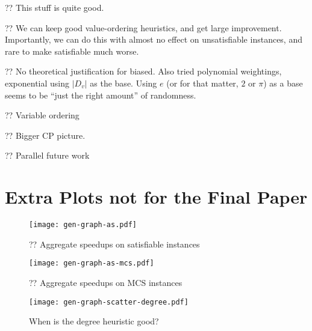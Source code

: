 \documentclass{article}
\begin{document}
?? This stuff is quite good.

?? We can keep good value-ordering heuristics, and get large improvement. Importantly, we can do
this with almost no effect on unsatisfiable instances, and rare to make satisfiable much worse.

?? No theoretical justification for biased. Also tried polynomial weightings, exponential using
$\left|D_v\right|$ as the base. Using $e$ (or for that matter, $2$ or $\pi$) as a base seems to be
``just the right amount'' of randomness.

?? Variable ordering

?? Bigger CP picture.

?? Parallel future work

\clearpage



\clearpage
\appendix

\section{Extra Plots not for the Final Paper}

\begin{figure}[h]
    \centering
    \texttt{[image: gen-graph-as.pdf]}
    \caption{?? Aggregate speedups on satisfiable instances}
\end{figure}

\begin{figure}[h]
    \centering
    \texttt{[image: gen-graph-as-mcs.pdf]}
    \caption{?? Aggregate speedups on MCS instances}
\end{figure}

\begin{figure}[h]
    \centering
    \texttt{[image: gen-graph-scatter-degree.pdf]}

    \caption{When is the degree heuristic good?}
    \label{figure:scatter-degree}
\end{figure}
\end{document}
